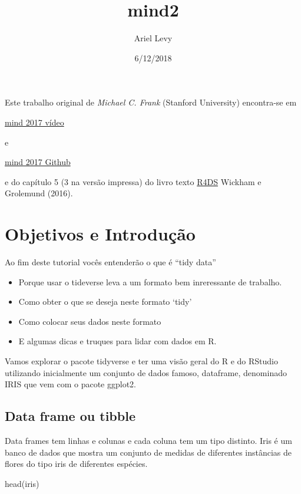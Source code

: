 \documentclass[
]{article}
\title{mind2}
\author{Ariel Levy}
\date{6/12/2018}
\newenvironment{Shaded}{\begin{snugshade}}{\end{snugshade}}
\newcommand{\FunctionTok}[1]{\textcolor[rgb]{0.00,0.00,0.00}{#1}}
\newcommand{\NormalTok}[1]{#1}
\begin{document}
\maketitle

Este trabalho original de \emph{Michael C. Frank} (Stanford University)
encontra-se em

\href{https://www.youtube.com/watch?v=qvPDE4ppAns\&t=757s}{mind 2017
vídeo}

e

\href{https://github.com/Data-on-the-Mind/2017-summer-workshop}{mind
2017 Github}

e do capítulo 5 (3 na versão impressa) do livro texto
\href{http://r4ds.had.co.nz/}{R4DS} Wickham e Grolemund (2016).

\hypertarget{objetivos-e-introduuxe7uxe3o}{%
\section{Objetivos e Introdução}\label{objetivos-e-introduuxe7uxe3o}}

Ao fim deste tutorial vocês entenderão o que é ``tidy data''

\begin{itemize}
\item
  Porque usar o tideverse leva a um formato bem inreressante de
  trabalho.
\item
  Como obter o que se deseja neste formato `tidy'
\item
  Como colocar seus dados neste formato
\item
  E algumas dicas e truques para lidar com dados em R.
\end{itemize}

Vamos explorar o pacote tidyverse e ter uma visão geral do R e do
RStudio utilizando inicialmente um conjunto de dados famoso, dataframe,
denominado IRIS que vem com o pacote ggplot2.

\hypertarget{data-frame-ou-tibble}{%
\subsection{Data frame ou tibble}\label{data-frame-ou-tibble}}

Data frames tem linhas e colunas e cada coluna tem um tipo distinto.
Iris é um banco de dados que mostra um conjunto de medidas de diferentes
instâncias de flores do tipo iris de diferentes espécies.

\begin{Shaded}
\begin{Highlighting}[]
\FunctionTok{head}\NormalTok{(iris)}
\end{Highlighting}
\end{Shaded}
\end{document}
